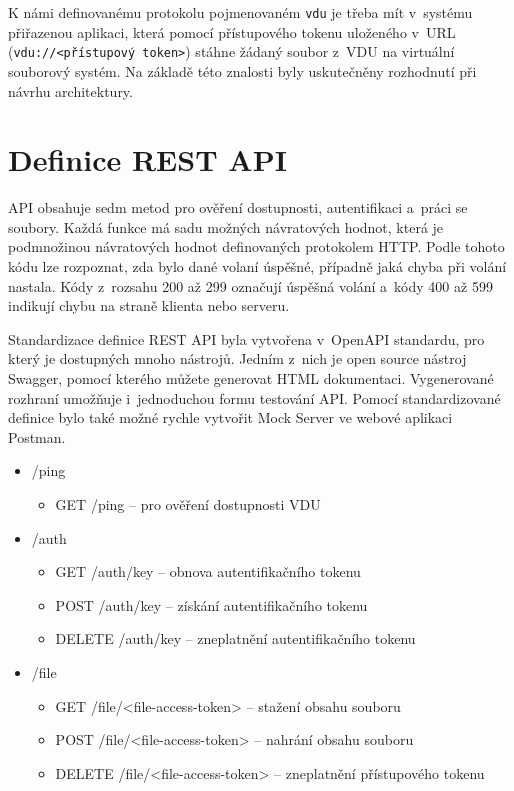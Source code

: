 K námi definovanému protokolu pojmenovaném \texttt{vdu} je třeba mít v systému přiřazenou aplikaci, která pomocí přístupového tokenu uloženého v URL 
(\texttt{\mbox{vdu://<přístupový token>}}) stáhne žádaný soubor z VDU na virtuální souborový systém. Na základě této znalosti byly uskutečněny rozhodnutí při návrhu architektury.
 
\section{Definice REST API}

API obsahuje sedm metod pro ověření dostupnosti, autentifikaci a práci se soubory. Každá funkce má sadu možných návratových hodnot, která je podmnožinou návratových hodnot
definovaných protokolem HTTP. Podle tohoto kódu lze rozpoznat, zda bylo dané volaní úspěšné, případně jaká chyba při volání nastala. Kódy z rozsahu 200 až 299 označují
úspěšná volání a kódy 400 až 599 indikují chybu na straně klienta nebo serveru.

Standardizace definice REST API byla vytvořena v OpenAPI standardu, pro který je dostupných mnoho nástrojů. Jedním z nich je open source nástroj Swagger, pomocí kterého
můžete generovat HTML dokumentaci. Vygenerované rozhraní umožňuje i jednoduchou formu testování API. Pomocí standardizované definice bylo také možné rychle vytvořit 
Mock Server ve webové aplikaci Postman.

\begin{itemize}
    \item /ping
    \begin{itemize}
        \item GET /ping – pro ověření dostupnosti VDU        
    \end{itemize}
    \item /auth
    \begin{itemize}
        \item GET /auth/key – obnova autentifikačního tokenu
        \item POST /auth/key – získání autentifikačního tokenu
        \item DELETE /auth/key – zneplatnění autentifikačního tokenu
    \end{itemize}
    \item /file
    \begin{itemize}
        \item GET /file/<file-access-token> – stažení obsahu souboru
        \item POST /file/<file-access-token> – nahrání obsahu souboru
        \item DELETE /file/<file-access-token> – zneplatnění přístupového tokenu
    \end{itemize}
\end{itemize}

